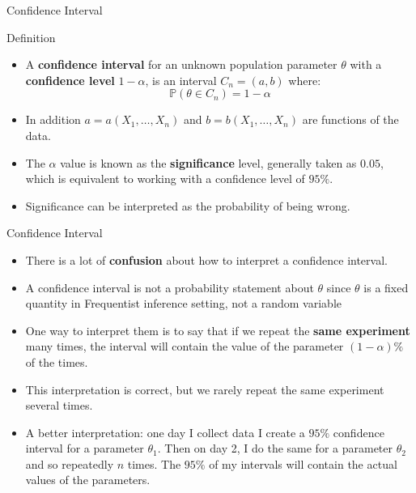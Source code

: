 \documentclass[handout]{beamer}
\begin{document}
\begin{frame}{Confidence Interval }
\scriptsize{

\begin{block}{Definition}
\begin{itemize}
 \item A \textbf{confidence interval} for an unknown population parameter $\theta$ with a \textbf{confidence level} $1-\alpha$, is an interval $C_n = (a,b)$ where:
 \begin{displaymath}
 \mathbb{P}(\theta \in C_n) = 1-\alpha
\end{displaymath}
 \item In addition $a= a(X_1, \dots, X_n)$ and $b=b(X_1,\dots,X_n)$ are functions of the data.
 \item The $\alpha$ value is known as the \textbf{significance} level, generally taken as $0.05$, which is equivalent to working with a confidence level of $95\%$.
 \item Significance can be interpreted as the probability of being wrong.
\end{itemize}

\end{block}

}
 
\end{frame}


\begin{frame}{Confidence Interval}
\scriptsize{


\begin{itemize}
 \item There is a lot of \textbf{confusion} about how to interpret a confidence interval.
 \item A confidence interval is not a probability statement about $\theta$ since $\theta$ is a fixed quantity in Frequentist inference setting, not a random variable
 \item One way to interpret them is to say that if we repeat the \textbf{same experiment} many times, the interval will contain the value of the parameter $(1-\alpha)\%$ of the times.
 \item This interpretation is correct, but we rarely repeat the same experiment several times.
 \item A better interpretation: one day I collect data I create a $95\%$ confidence interval for a parameter $\theta_1$. Then on day 2, I do the same for a parameter $\theta_2$ and so repeatedly $n$ times. The $95\%$ of my intervals will contain the actual values of the parameters. 
 
\end{itemize}



}
 
\end{frame}
\end{document}
